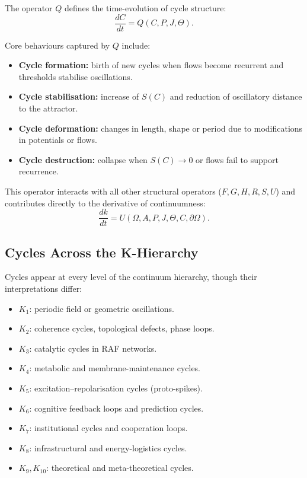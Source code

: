 The operator \(Q\) defines the time-evolution of cycle structure:
\[
  \frac{dC}{dt} = Q(C,P,J,\Theta).
\]

Core behaviours captured by \(Q\) include:
\begin{itemize}
  \item \textbf{Cycle formation:} birth of new cycles when flows become
        recurrent and thresholds stabilise oscillations.
  \item \textbf{Cycle stabilisation:} increase of \(S(C)\) and reduction of
        oscillatory distance to the attractor.
  \item \textbf{Cycle deformation:} changes in length, shape or period due to
        modifications in potentials or flows.
  \item \textbf{Cycle destruction:} collapse when  
        \(S(C)\to 0\) or flows fail to support recurrence.
\end{itemize}

This operator interacts with all other structural operators
(\(F,G,H,R,S,U\)) and contributes directly to the derivative of
continuumness:
\[
  \frac{dk}{dt} = U(\Omega,A,P,J,\Theta,C,\partial\Omega).
\]

\subsection{Cycles Across the K-Hierarchy}

Cycles appear at every level of the continuum hierarchy, though
their interpretations differ:

\begin{itemize}
  \item \(K_1\): periodic field or geometric oscillations.
  \item \(K_2\): coherence cycles, topological defects, phase loops.
  \item \(K_3\): catalytic cycles in RAF networks.
  \item \(K_4\): metabolic and membrane-maintenance cycles.
  \item \(K_5\): excitation–repolarisation cycles (proto-spikes).
  \item \(K_6\): cognitive feedback loops and prediction cycles.
  \item \(K_7\): institutional cycles and cooperation loops.
  \item \(K_8\): infrastructural and energy-logistics cycles.
  \item \(K_9,K_{10}\): theoretical and meta-theoretical cycles.
\end{itemize}

